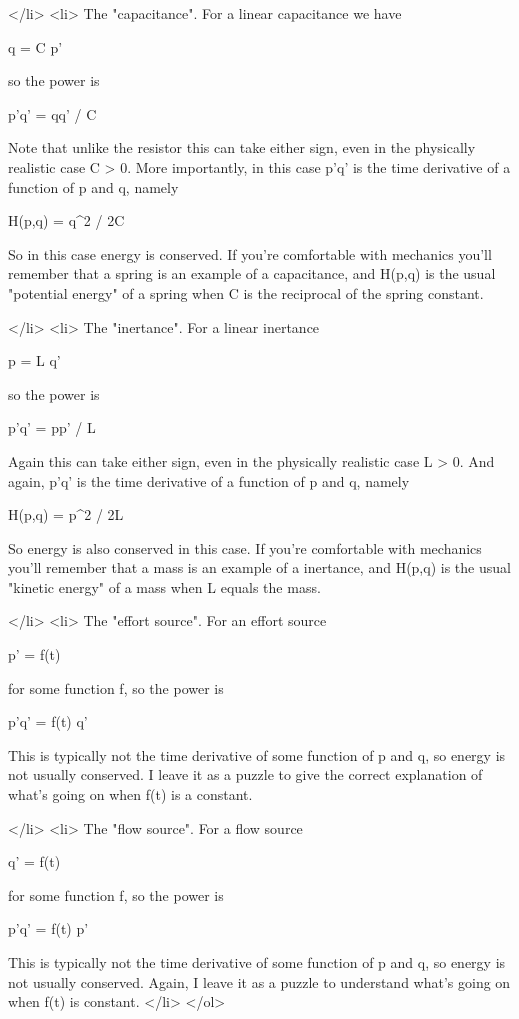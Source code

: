 </li>
<li>
   The "capacitance".  For a linear capacitance we have

  q = C p'

  so the power is 

  p'q' = qq' / C

  Note that unlike the resistor this can take either sign, even
  in the physically realistic case C > 0.  More importantly, in
  this case p'q' is the time derivative of a function of p and q,
  namely 

  H(p,q) = q^{2} / 2C

  So in this case energy is conserved.  If you're comfortable
  with mechanics you'll remember that a spring is an example of
  a capacitance, and H(p,q) is the usual "potential energy" of a 
  spring when C is the reciprocal of the spring constant.
  
</li>
<li>
   The "inertance".  For a linear inertance

  p = L q'

  so the power is

  p'q' = pp' / L

  Again this can take either sign, even in the physically realistic
  case L > 0.  And again, p'q' is the time derivative of a function
  of p and q, namely

  H(p,q) = p^{2} / 2L

  So energy is also conserved in this case.  If you're comfortable
  with mechanics you'll remember that a mass is an example of
  a inertance, and H(p,q) is the usual "kinetic energy" of a mass
  when L equals the mass.

</li>
<li>
   The "effort source".  For an effort source

  p' = f(t)

  for some function f, so the power is

  p'q' = f(t) q'

  This is typically not the time derivative of some function of
  p and q, so energy is not usually conserved.  I leave it
  as a puzzle to give the correct explanation of what's going on
  when f(t) is a constant.  

</li>
<li>
  The "flow source".  For a flow source

  q' = f(t)

  for some function f, so the power is

  p'q' = f(t) p'

  This is typically not the time derivative of some function of
  p and q, so energy is not usually conserved.  Again, I
  leave it as a puzzle to understand what's going on when f(t)
  is constant.
</li>
</ol>

